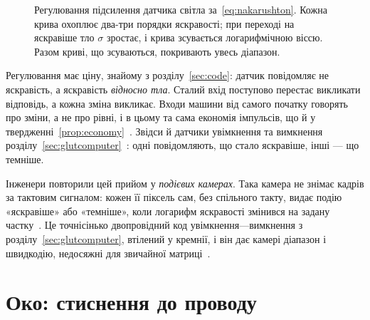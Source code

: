 \begin{figure}[t]
\centering
{}
\caption{Регулювання підсилення датчика світла за~\eqref{eq:nakarushton}. Кожна крива охоплює два-три порядки яскравості; при переході на яскравіше тло $\sigma$ зростає, і крива зсувається логарифмічною віссю. Разом криві, що зсуваються, покривають увесь діапазон.}
\label{fig:adaptation}
\end{figure}

Регулювання має ціну, знайому з розділу~\ref{sec:code}: датчик повідомляє не яскравість, а яскравість \emph{відносно тла}. Сталий вхід поступово перестає викликати відповідь, а кожна зміна викликає. Входи машини від самого початку говорять про зміни, а не про рівні, і в цьому та сама економія імпульсів, що й у твердженні~\ref{prop:economy}~\cite{Barlow1961}. Звідси й датчики увімкнення та вимкнення розділу~\ref{sec:glutcomputer}~\cite{Schiller1992}: одні повідомляють, що стало яскравіше, інші --- що темніше.

Інженери повторили цей прийом у \emph{подієвих камерах}. Така камера не знімає кадрів за тактовим сигналом: кожен її піксель сам, без спільного такту, видає подію «яскравіше» або «темніше», коли логарифм яскравості змінився на задану частку~\cite{Lichtsteiner2008}. Це точнісінько двопровідний код увімкнення---вимкнення з розділу~\ref{sec:glutcomputer}, втілений у кремнії, і він дає камері діапазон і швидкодію, недосяжні для звичайної матриці~\cite{Gallego2022}.

\section{Око: стиснення до проводу}


